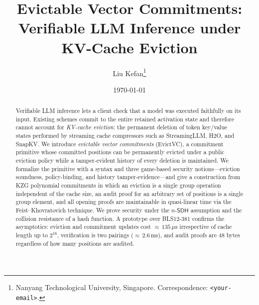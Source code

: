 \newcommand{\pp}{\mathsf{pp}}
\newcommand{\aux}{\mathsf{st}}
\newcommand{\Pol}{\mathsf{Pol}}
\newcommand{\HistDig}{\mathsf{HistDig}}
\newcommand{\Adv}{\mathsf{Adv}}
\newcommand{\Exp}{\mathsf{Exp}}
\newcommand{\Val}{\mathrm{val}}
\newcommand{\Sc}{\mathrm{sc}}
\newcommand{\Cval}{C_{\Val}}
\newcommand{\Csc}{C_{\Sc}}
\newcommand{\Live}{\Lambda}
\newcommand{\Evicted}{E}
\newcommand{\A}{\mathcal{A}}
\newcommand{\B}{\mathcal{B}}
\newcommand{\Vsp}{\mathcal{V}}
\newcommand{\Ssp}{\mathcal{S}}
\newcommand{\Tsp}{\mathcal{T}}
\newcommand{\hash}{\mathsf{H}}
\newcommand{\VC}{\mathsf{VC}}
\newcommand{\Log}{\mathcal{L}}
\newcommand{\GG}{\mathbb{G}}
\newcommand{\FF}{\mathbb{F}}
\newcommand{\gone}[1]{\left[#1\right]_{1}}
\newcommand{\gtwo}[1]{\left[#1\right]_{2}}
\newcommand{\gtt}[1]{\left[#1\right]_{T}}
\newcommand{\dom}{\mathbb{D}}
\newcommand{\lag}{\ell}
\newcommand{\srs}{\mathsf{srs}}
\newcommand{\nsdh}{n\text{-}\mathsf{SDH}}
\newcommand{\Zpol}{Z}
\newcommand{\rpol}{r}
\newcommand{\posbind}{\mathsf{pos\text{-}bind}}
\newcommand{\evsnd}{\mathsf{ev\text{-}snd}}
\newcommand{\polbind}{\mathsf{pol\text{-}bind}}
\newcommand{\histte}{\mathsf{hist\text{-}te}}
\newcommand{\collres}{\mathsf{cr}}

\title{Evictable Vector Commitments:\\
       Verifiable LLM Inference under KV-Cache Eviction}
\author{Liu Kefan\thanks{Nanyang Technological University, Singapore.
        Correspondence: \texttt{<your-email>}.}}
\date{\today}


\maketitle

\begin{abstract}
Verifiable LLM inference lets a client check that a model was executed
faithfully on its input. Existing schemes commit to the entire retained
activation state and therefore cannot account for \emph{KV-cache eviction}:
the permanent deletion of token key/value states performed by streaming cache
compressors such as StreamingLLM, H2O, and SnapKV. We introduce
\emph{evictable vector commitments} (EvictVC), a commitment primitive whose
committed positions can be permanently evicted under a public eviction policy
while a tamper-evident history of every deletion is maintained. We formalize
the primitive with a syntax and three game-based security notions---eviction
soundness, policy-binding, and history tamper-evidence---and give a
construction from KZG polynomial commitments in which an eviction is a single
group operation independent of the cache size, an audit proof for an arbitrary
set of positions is a single group element, and all opening proofs are
maintainable in quasi-linear time via the Feist--Khovratovich technique. We
prove security under the $\nsdh$ assumption and the collision resistance of a
hash function. A prototype over BLS12-381 confirms the asymptotics: eviction and
commitment updates cost ${\approx}\,135\,\mu\mathrm{s}$ irrespective of cache
length up to $2^{16}$, verification is two pairings
(${\approx}\,2.6\,\mathrm{ms}$), and audit proofs are $48$ bytes regardless of
how many positions are audited.
\end{abstract}

